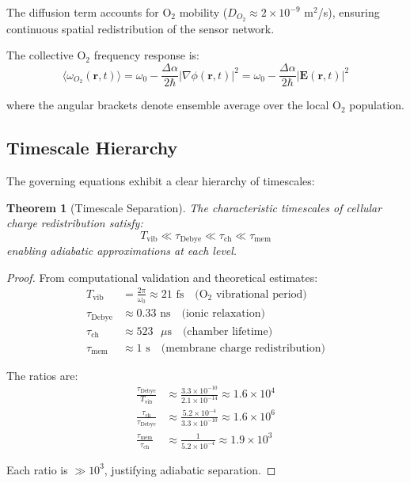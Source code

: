 \documentclass[twocolumn,10pt,aps,prd,superscriptaddress,floatfix,nofootinbib]{revtex4-2}
\newtheorem{theorem}{Theorem}[section]
\theoremstyle{remark}
\begin{document}
The diffusion term accounts for O$_2$ mobility ($D_{O_2} \approx 2 \times 10^{-9}$ m$^2$/s), ensuring continuous spatial redistribution of the sensor network.

The collective O$_2$ frequency response is:
\begin{equation}
\langle\omega_{O_2}(\mathbf{r}, t)\rangle = \omega_0 - \frac{\Delta\alpha}{2\hbar}|\nabla\phi(\mathbf{r}, t)|^2 = \omega_0 - \frac{\Delta\alpha}{2\hbar}|\mathbf{E}(\mathbf{r}, t)|^2
\label{eq:O2_response}
\end{equation}

where the angular brackets denote ensemble average over the local O$_2$ population.

\subsection{Timescale Hierarchy}

The governing equations exhibit a clear hierarchy of timescales:

\begin{theorem}[Timescale Separation]
\label{thm:timescale_hierarchy}
The characteristic timescales of cellular charge redistribution satisfy:
\begin{equation}
T_{\mathrm{vib}} \ll \tau_{\mathrm{Debye}} \ll \tau_{\mathrm{ch}} \ll \tau_{\mathrm{mem}}
\label{eq:timescale_hierarchy}
\end{equation}
enabling adiabatic approximations at each level.
\end{theorem}

\begin{proof}
From computational validation and theoretical estimates:
\begin{align}
T_{\mathrm{vib}} &= \frac{2\pi}{\omega_0} \approx 21 \text{ fs} \quad \text{(O$_2$ vibrational period)} \\
\tau_{\mathrm{Debye}} &\approx 0.33 \text{ ns} \quad \text{(ionic relaxation)} \\
\tau_{\mathrm{ch}} &\approx 523 \text{ $\mu$s} \quad \text{(chamber lifetime)} \\
\tau_{\mathrm{mem}} &\approx 1 \text{ s} \quad \text{(membrane charge redistribution)}
\end{align}

The ratios are:
\begin{align}
\frac{\tau_{\mathrm{Debye}}}{T_{\mathrm{vib}}} &\approx \frac{3.3 \times 10^{-10}}{2.1 \times 10^{-14}} \approx 1.6 \times 10^{4} \\
\frac{\tau_{\mathrm{ch}}}{\tau_{\mathrm{Debye}}} &\approx \frac{5.2 \times 10^{-4}}{3.3 \times 10^{-10}} \approx 1.6 \times 10^{6} \\
\frac{\tau_{\mathrm{mem}}}{\tau_{\mathrm{ch}}} &\approx \frac{1}{5.2 \times 10^{-4}} \approx 1.9 \times 10^{3}
\end{align}

Each ratio is $\gg 10^3$, justifying adiabatic separation.
\end{proof}
\end{document}
